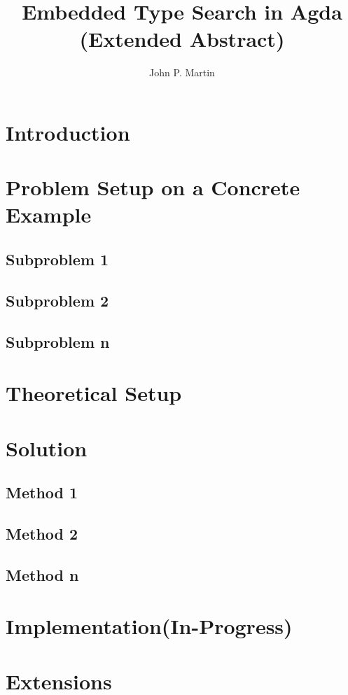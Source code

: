 \documentclass[sigplan,screen,review]{acmart}
\title{Embedded Type Search in Agda\\ (Extended Abstract)}
\begin{document}
\author{John P. Martin}



\maketitle

\section{Introduction}

\section{Problem Setup on a Concrete Example}

\subsection{Subproblem 1}

\subsection{Subproblem 2}

\subsection{Subproblem n}

\section{Theoretical Setup}

\section{Solution}

\subsection{Method 1}

\subsection{Method 2}

\subsection{Method n}

\section{Implementation(In-Progress)}

\section{Extensions}
\end{document}
